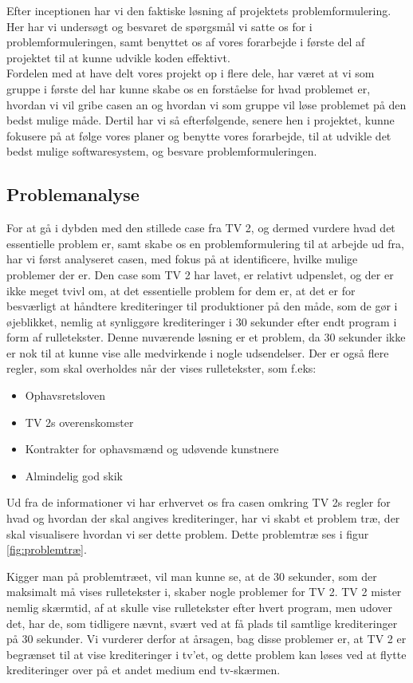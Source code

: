 Efter inceptionen har vi den faktiske løsning af projektets problemformulering. Her har vi undersøgt og besvaret de spørgsmål vi satte os for i problemformuleringen, samt benyttet os af vores forarbejde i første del af projektet til at kunne udvikle koden effektivt.\\
Fordelen med at have delt vores projekt op i flere dele, har været at vi som gruppe i første del har kunne skabe os en forståelse for hvad problemet er, hvordan vi vil gribe casen an og hvordan vi som gruppe vil løse problemet på den bedst mulige måde. Dertil har vi så efterfølgende, senere hen i projektet, kunne fokusere på at følge vores planer og benytte vores forarbejde, til at udvikle det bedst mulige softwaresystem, og besvare problemformuleringen.

\subsection{Problemanalyse}
For at gå i dybden med den stillede case fra TV 2, og dermed vurdere hvad det essentielle problem er, samt skabe os en problemformulering til at arbejde ud fra, har vi først analyseret casen, med fokus på at identificere, hvilke mulige problemer der er. Den case som TV 2 har lavet, er relativt udpenslet, og der er ikke meget tvivl om, at det essentielle problem for dem er, at det er for besværligt at håndtere krediteringer til produktioner på den måde, som de gør i øjeblikket, nemlig at synliggøre krediteringer i 30 sekunder efter endt program i form af rulletekster. Denne nuværende løsning er et problem, da 30 sekunder ikke er nok til at kunne vise alle medvirkende i nogle udsendelser. \cite{url_case} Der er også flere regler, som skal overholdes når der vises rulletekster, som f.eks:
\begin{itemize}
    \item Ophavsretsloven
    \item TV 2s overenskomster
    \item Kontrakter for ophavsmænd og udøvende kunstnere
    \item Almindelig god skik
\end{itemize}
Ud fra de informationer vi har erhvervet os fra casen omkring TV 2s regler for hvad og hvordan der skal angives krediteringer, har vi skabt et problem træ, der skal visualisere hvordan vi ser dette problem. Dette problemtræ ses i figur \ref{fig:problemtræ}. 

Kigger man på problemtræet, vil man kunne se, at de 30 sekunder, som der maksimalt må vises rulletekster i, skaber nogle problemer for TV 2. TV 2 mister nemlig skærmtid, af at skulle vise rulletekster efter hvert program, men udover det, har de, som tidligere nævnt, svært ved at få plads til samtlige krediteringer på 30 sekunder. Vi vurderer derfor at årsagen, bag disse problemer er, at TV 2 er begrænset til at vise krediteringer i tv'et, og dette problem kan løses ved at flytte krediteringer over på et andet medium end tv-skærmen. 

